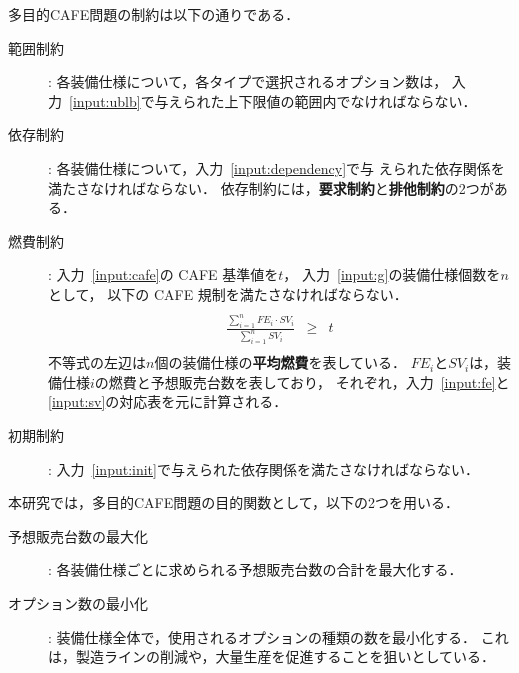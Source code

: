 多目的CAFE問題の制約は以下の通りである．
\begin{description}
\item[範囲制約]: 各装備仕様について，各タイプで選択されるオプション数は，
  入力~\ref{input:ublb}で与えられた上下限値の範囲内でなければならない．
\item[依存制約]: 各装備仕様について，入力~\ref{input:dependency}で与
  えられた依存関係を満たさなければならない．
  依存制約には，{\bf 要求制約}と{\bf 排他制約}の2つがある．
\item[燃費制約]: 入力~\ref{input:cafe}の CAFE 基準値を$t$，
  入力~\ref{input:g}の装備仕様個数を$n$として，
  以下の CAFE 規制を満たさなければならない．
  \[
    \begin{array}{lcr}
      & & \\
      \displaystyle\frac{\sum_{i=1}^{n} FE_{i}\cdot SV_{i}}{\sum_{i=1}^{n} SV_{i}}
      &
        \geq 
      &
        t \\
      & & 
    \end{array}
  \]
  不等式の左辺は$n$個の装備仕様の\textbf{平均燃費}を表している．
  $FE_{i}$と$SV_{i}$は，装備仕様$i$の燃費と予想販売台数を表しており，
  それぞれ，入力~\ref{input:fe}と\ref{input:sv}の対応表を元に計算される．
\item[初期制約]:
  入力~\ref{input:init}で与えられた依存関係を満たさなければならない．
\end{description}

本研究では，多目的CAFE問題の目的関数として，以下の2つを用いる．
\begin{description}
 \item[予想販売台数の最大化]: 各装備仕様ごとに求められる予想販売台数の合計を最大化する．
 \item[オプション数の最小化]: 装備仕様全体で，使用されるオプションの種類の数を最小化する．
	    これは，製造ラインの削減や，大量生産を促進することを狙いとしている．
\end{description}


